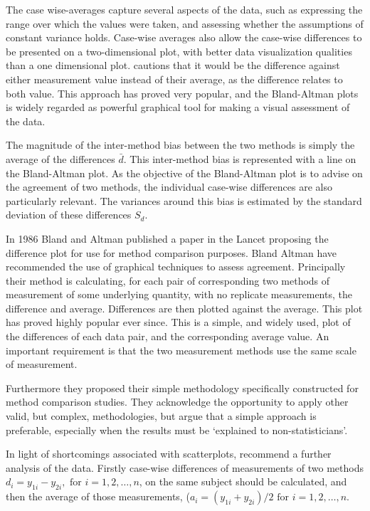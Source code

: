 \documentclass[12pt, a4paper]{report}
\theoremstyle{plain}
\theoremstyle{definition}
\theoremstyle{remark}
\begin{document}
	The case wise-averages capture several aspects of the data, such as expressing the range over which the values were taken, and assessing whether the assumptions of constant variance holds. Case-wise averages also allow the case-wise differences to be presented on a two-dimensional plot, with better data visualization qualities than a one dimensional plot. \citet{BA86}
	cautions that it would be the difference against either measurement value instead of their average, as the difference relates to both value. This approach has proved very popular, and the Bland-Altman plots is widely regarded as powerful graphical tool for making a visual assessment of the data.
	
	The magnitude of the inter-method bias between the two methods is simply the average of the differences $\bar{d}$. This inter-method bias is represented with a line on the Bland-Altman plot. As the objective of the Bland-Altman plot is to advise on the agreement of two methods, the individual case-wise differences are also particularly relevant. The variances around this bias is estimated by the standard deviation of these differences $S_{d}$.
	
	In 1986 Bland and Altman published a paper in the Lancet proposing the difference plot for use for method comparison purposes. Bland Altman have recommended the use of graphical techniques to assess agreement. Principally their method is calculating, for each pair of corresponding two methods of measurement of some
	underlying quantity, with no replicate measurements, the
	difference and average. Differences are then plotted against the
	average. This plot has proved highly popular ever since. This is a simple, and widely used, plot of the differences of each data pair, and the corresponding average value. An important requirement is that the	two measurement methods use the same scale of measurement.
	
	Furthermore they proposed their simple methodology specifically constructed for method comparison studies. They acknowledge the opportunity to apply other valid, but complex, methodologies, but argue that a simple approach is preferable, especially when the results must be `explained to non-statisticians'.
	
		
	In light of shortcomings associated with scatterplots,
	\citet*{BA83} recommend a further analysis of the data. Firstly
	case-wise differences of measurements of two methods $d_{i} =
	y_{1i}-y_{2i}, \mbox{ for }i=1,2,\dots,n$, on the same subject
	should be calculated, and then the average of those measurements, 
	($a_{i} = (y_{1i} + y_{2i})/2 \mbox{ for }i=1,2,\dots, n$.
	
\end{document}
